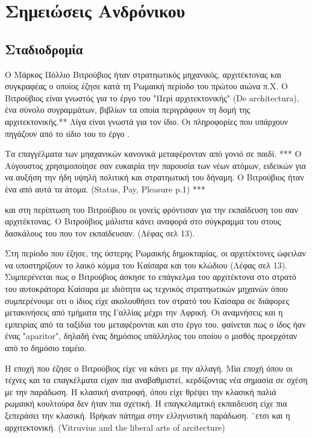 
\section{Σημειώσεις Ανδρόνικου}

\subsection{Σταδιοδρομία}

Ο Μάρκος Πόλλιο Βιτρούβιος ήταν στρατηωτικός μηχανικός, αρχιτέκτονας και συγκραφέας ο οποίος έζησε κατά τη Ρωμαική περίοδο του πρώτου αιώνα π.Χ. Ο Βιτρούβιος είναι γνωστός για το έργο του "Περί αρχιτεκτονικής" (De architectura), ένα σύνολο συγραμμάτων, βιβλίων τα οποία περιγράφουν τη δομή της αρχιτεκτονικής.** Λίγα είναι γνωστά για τον ίδιο. Οι πληροφορίες που υπάρχουν πηγάζουν από το ιίδιο του το έργο \cite[σ.~390]{masterson_status_2004}.

Τα επαγγέλματα των μηαχανικών κανονικά μεταφέρονταν από γονιό σε παιδί.  *** 
Ο Αύγουστος χρησιμοποίησε σαν ευκαιρία την παρουσία των νέων ατόμων, ειδεικών για να αυξήση την ήδη υψηλή πολιτική και στρατηωτική του δήναμη. Ο Βιτρούβιος ήταν ένα από αυτά τα άτομα. (Status, Pay, Pleasure p.1) ***

και στη περίπτωση του Βιτρούβιου οι γονείς φρόντισαν για την εκπαίδευση του σαν αρχιτέκτονας. Ο Βιτρούβιος μάλιστα κάνει αναφορά στο σύγκραμμα του στους δασκάλους του που τον εκπαίδευσαν. (Λέφας σελ 13).

Στη περίοδο που έζησε, της ύστερης Ρωμαικής δημοκταρίας, οι αρχιτέκτονες ώφειλαν να υποστηρίζουν το λαικό κόμμα του Καίσαρα και του κλώδιου (Λέφας σελ 13). Συμπερένεται πως ο Βιτρούβιος άσκησε το επάγκελμα του αρχιτέκτονα στο στρατό του αυτοκράτορα Καίσαρα με ιδιότητα ως τεχνικός στρατηωτικών μηχανών όπου συμπερένουμε οτι ο ίδιος είχε ακολουθήσει τον στρατό του Καίσαρα σε διάφορες μετακινήσεις από τμήματα της Γαλλίας μέχρι την Αφρική. Οι αναμνήσεις και η εμπειρίας από τα ταξίδια του μεταφέρονται και στο έργο του. φαίνεται πως ο ίδος ήαν ένας "aparitor", δηλαδή ένας δημόσιος υπάλληλος του οποίου ο μισθός προερχόταν από το δημόσιο ταμέιο.

Η εποχή που έζησε ο Βιτρούβιος είχε να κάνει με την αλλαγή. Μία εποχή όπου οι τέχνες και τα επαγκέλματα είχαν πια αναβαθμιστεί, κερδίζοντας νέα σημασία σε σχέση με την παράδωση. Η κλασική ανατροφή, όπου είχε θρέψει την κλασική παλιά ρωμαική κουλτούρα δεν ήταν πια σχετική. Η επαγκελαμτική εκπαιδευση είχε πια ξεπεράσει την κλασική. Βρήκαν πάτημα στην ελληνιστική παράδωση. ¨ετσι και η αρχιτεκτονική. (Vitruvius and the liberal arts of arcitecture)

